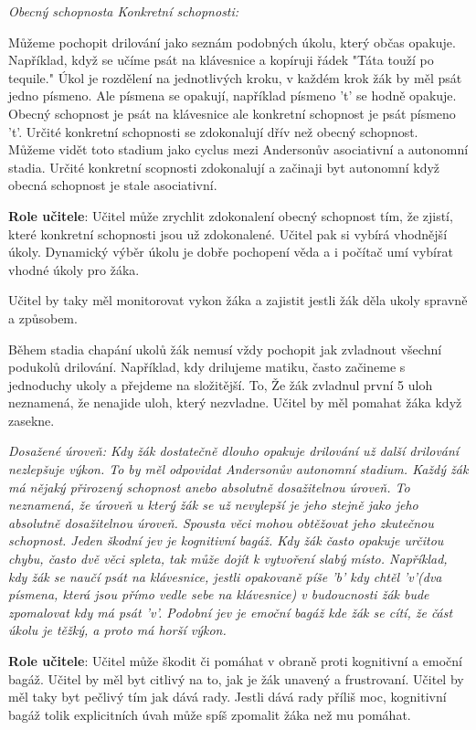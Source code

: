\em Obecný schopnost\em a \em Konkretní schopnosti\em :

Můžeme pochopit drilování jako seznám podobných úkolu, který občas opakuje.  Například, když se učíme psát na klávesnice a kopíruji řádek "Táta touží po tequile." Úkol je rozdělení na jednotlivých kroku, v každém krok žák by měl psát jedno písmeno.  Ale písmena se opakují, například písmeno 't' se hodně opakuje.  Obecný schopnost je psát na klávesnice ale konkretní schopnost je psát písmeno 't'. Určité konkretní schopnosti se zdokonalují dřív než obecný schopnost.  Můžeme vidět toto stadium jako cyclus mezi Andersonův asociativní a autonomní stadia.  Určité konkretní scopnosti zdokonalují a začinaji byt autonomní když obecná schopnost je stale asociativní.

{\bf Role učitele}: Učitel může zrychlit zdokonalení obecný schopnost tím, že zjistí, které konkretní schopnosti jsou už zdokonalené.  Učitel pak si vybírá vhodnější úkoly.  Dynamický výběr úkolu je dobře pochopení věda\citep{hintzman1976repetition} a i počítač umí vybírat vhodné úkoly pro žáka\citep{anki}.

Učitel by taky měl monitorovat vykon žáka a zajistit jestli žák děla ukoly spravně a  způsobem.

Během stadia chapání ukolů žák nemusí vždy pochopit jak zvladnout všechní podukolů drilování.  Například, kdy drilujeme matiku, často začineme s jednoduchy ukoly a přejdeme na složitější.  To, Že žák zvladnul první 5 uloh neznamená, že nenajide uloh, který nezvladne.  Učitel by měl pomahat žáka když zasekne.

\em Dosažené úroveň\em : Kdy žák dostatečně dlouho opakuje drilování už další drilování nezlepšuje výkon.  To by měl odpovidat Andersonův autonomní stadium.  Každý žák má nějaký přirozený schopnost anebo absolutně dosažitelnou úroveň.  To neznamená, že úroveň u který žák se už nevylepší je jeho stejně jako jeho absolutně dosažitelnou úroveň.  Spousta věci mohou obtěžovat jeho zkutečnou schopnost.  Jeden škodní jev je kognitivní bagáž. Kdy žák často opakuje určitou chybu, často dvě věci spleta, tak může dojít k vytvoření slabý místo. Například, kdy žák se naučí psát na klávesnice, jestli opakovaně píše 'b' kdy chtěl 'v'(dva písmena, která jsou přímo vedle sebe na klávesnice) v budoucnosti žák bude zpomalovat kdy má psát 'v'. Podobní jev je emoční bagáž kde žák se cítí, že část úkolu je těžký, a proto má horší výkon.

{\bf Role učitele}: Učitel může škodit či pomáhat v obraně proti kognitivní a emoční bagáž.  Učitel by měl byt citlivý na to, jak je žák unavený a frustrovaní. Učitel by měl taky byt pečlivý tím jak dává rady.  Jestli dává rady příliš moc, kognitivní bagáž tolik explicitních úvah může spíš zpomalit žáka než mu pomáhat.
